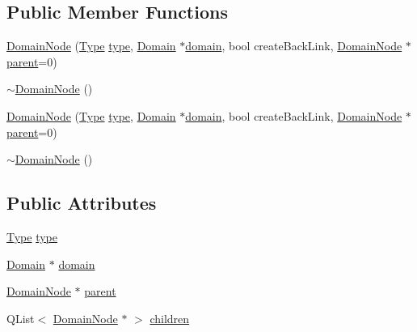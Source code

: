 \subsection*{Public Member Functions}
\begin{DoxyCompactItemize}
\item 
\hyperlink{class_domain_node_a65429496473be10e3c63381f1aa1bc58}{DomainNode} (\hyperlink{class_domain_node_a0fb690a57557ab235757fd123557fb4f}{Type} \hyperlink{class_domain_node_a5544123414851eb1258dcfd217cc77d9}{type}, \hyperlink{class_domain}{Domain} $\ast$\hyperlink{class_domain_node_a3df2a65aeff125c0808d4cd481e24824}{domain}, bool createBackLink, \hyperlink{class_domain_node}{DomainNode} $\ast$\hyperlink{class_domain_node_a54d758220283d746678ac965504cbcc2}{parent}=0)
\item 
\hyperlink{class_domain_node_ad9ffcd4f7d2668addfffd78bc0ce5439}{$\sim$DomainNode} ()
\item 
\hyperlink{class_domain_node_a65429496473be10e3c63381f1aa1bc58}{DomainNode} (\hyperlink{class_domain_node_a0fb690a57557ab235757fd123557fb4f}{Type} \hyperlink{class_domain_node_a5544123414851eb1258dcfd217cc77d9}{type}, \hyperlink{class_domain}{Domain} $\ast$\hyperlink{class_domain_node_a3df2a65aeff125c0808d4cd481e24824}{domain}, bool createBackLink, \hyperlink{class_domain_node}{DomainNode} $\ast$\hyperlink{class_domain_node_a54d758220283d746678ac965504cbcc2}{parent}=0)
\item 
\hyperlink{class_domain_node_ad9ffcd4f7d2668addfffd78bc0ce5439}{$\sim$DomainNode} ()
\end{DoxyCompactItemize}
\subsection*{Public Attributes}
\begin{DoxyCompactItemize}
\item 
\hyperlink{class_domain_node_a0fb690a57557ab235757fd123557fb4f}{Type} \hyperlink{class_domain_node_a5544123414851eb1258dcfd217cc77d9}{type}
\item 
\hyperlink{class_domain}{Domain} $\ast$ \hyperlink{class_domain_node_a3df2a65aeff125c0808d4cd481e24824}{domain}
\item 
\hyperlink{class_domain_node}{DomainNode} $\ast$ \hyperlink{class_domain_node_a54d758220283d746678ac965504cbcc2}{parent}
\item 
QList$<$ \hyperlink{class_domain_node}{DomainNode} $\ast$ $>$ \hyperlink{class_domain_node_a0e904db6c9cde57db5fb969325b3013f}{children}
\end{DoxyCompactItemize}


